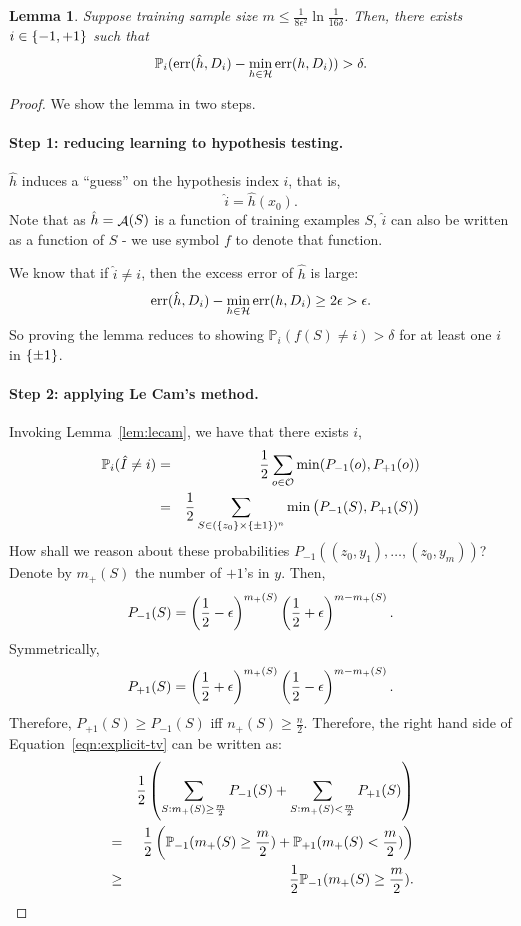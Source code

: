 \documentclass{article}
\newtheorem{lemma}{Lemma}
\DeclareMathOperator*{\err}{{\rm err}}
\DeclareMathOperator*{\Acal}{{\cal A}}
\newcommand{\PP}{\mathbb{P}}
\newcommand{\Hcal}{\mathcal{H}}
\newcommand{\Ocal}{\mathcal{O}}
\begin{document}

\begin{lemma}
Suppose training sample size $m \leq \frac{1}{8\epsilon^2}\ln\frac1{16\delta}$.
Then, there exists $i \in \cbr{-1,+1}$ such that
\[ \PP_i(\err(\hat{h}, D_i) - \min_{h \in \Hcal} \err(h, D_i) ) > \delta. \]
\end{lemma}

\begin{proof}
We show the lemma in two steps.

\paragraph{Step 1: reducing learning to hypothesis testing.}
$\hat{h}$ induces a ``guess'' on the hypothesis index $i$, that is,
\[ \hat{i} = \hat{h}(x_0). \]
Note that as $\hat{h} = \Acal(S)$ is a function of training examples $S$, $\hat{i}$
can also be written as a function of $S$ - we use symbol $f$ to denote that function.

We know that if $\hat{i} \neq i$, then the excess error of $\hat{h}$ is large:
\[ \err(\hat{h}, D_i) - \min_{h \in \Hcal} \err(h, D_i) \geq 2\epsilon > \epsilon. \]
So proving the lemma reduces to showing $\PP_i(f(S) \neq i) > \delta$
for at least one $i$ in $\cbr{\pm 1}$.


\paragraph{Step 2: applying Le Cam's method.}
Invoking Lemma~\ref{lem:lecam},
we have that there exists $i$,
\begin{eqnarray}
  \PP_i(\hat{I} \neq i)
  &=& \frac12\sum_{o \in \Ocal} \min(P_{-1}(o), P_{+1}(o)) \nonumber \\
  &=& \frac12\sum_{S \in (\cbr{z_0} \times \cbr{\pm 1})^n} \min\del{P_{-1}(S), P_{+1}(S)}
  \label{eqn:explicit-tv}
\end{eqnarray}
How shall we reason about these probabilities
$P_{-1}((z_0, y_1), \ldots, (z_0, y_m))$? Denote by $m_+(S)$ the number of
$+1$'s in $y$. Then,
\[ P_{-1}(S) = \del{\frac12 - \epsilon}^{m_+(S)}\del{\frac12 + \epsilon}^{m-m_+(S)}. \]
Symmetrically,
\[ P_{+1}(S) = \del{\frac12 + \epsilon}^{m_+(S)}\del{\frac12 - \epsilon}^{m-m_+(S)}. \]
Therefore, $P_{+1}(S) \geq P_{-1}(S)$ iff $n_+(S) \geq \frac n 2$. Therefore,
the right hand side of Equation~\eqref{eqn:explicit-tv} can be written as:
\begin{eqnarray}
  && \frac12
  \del{\sum_{S: m_+(S) \geq \frac m 2} P_{-1}(S)+\sum_{S: m_+(S) < \frac m 2} P_{+1}(S)} \nonumber \\
  &=& \frac 12 \del{\PP_{-1}(m_+(S) \geq \frac m 2) + \PP_{+1}(m_+(S) < \frac m 2)} \nonumber \\
  &\geq& \frac 12 \PP_{-1}(m_+(S) \geq \frac m 2).
  \label{eqn:bin-tail}
\end{eqnarray}


\end{proof}
\end{document}
